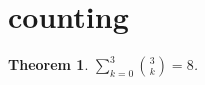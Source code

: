 \documentclass{article}
\newtheorem{theorem}{Theorem}
\begin{document}
\section{counting}

\begin{theorem}\label{thm:RC03}
$\sum_{k=0}^{3}\binom{3}{k}=8$.
\end{theorem}
\end{document}
